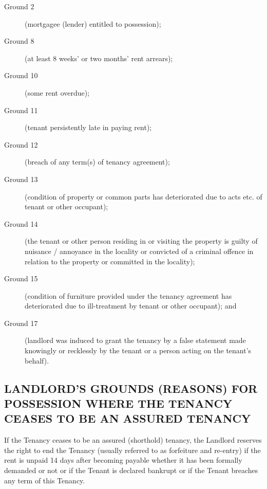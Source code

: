 \begin{description}

\item[Ground 2] (mortgagee (lender) entitled to possession);

\item[Ground 8] (at least 8 weeks' or two months' rent arrears);

\item[Ground 10] (some rent overdue);

\item[Ground 11] (tenant persistently late in paying rent);

\item[Ground 12] (breach of any term(s) of tenancy agreement);

\item[Ground 13] (condition of property or common parts has deteriorated      due to acts etc. of tenant or other occupant);

\item[Ground 14] (the tenant or other person residing in or visiting the     property is guilty of nuisance / annoyance in the locality or     convicted of a criminal offence in relation to the property or     committed in the locality);

\item[Ground 15] (condition of furniture provided under the tenancy     agreement has deteriorated due to ill-treatment by tenant or other     occupant); and

\item[Ground 17] (landlord was induced to grant the tenancy by a false     statement made knowingly or recklessly by the tenant or a person     acting on the tenant's behalf).

\end{description}

\subsection{LANDLORD'S GROUNDS (REASONS) FOR POSSESSION WHERE THE TENANCY CEASES TO BE AN ASSURED TENANCY}

If the Tenancy ceases to be an assured (shorthold) tenancy, the Landlord reserves the right to end the Tenancy (usually referred to as forfeiture and re-entry) if the rent is unpaid 14 days after becoming payable whether it has been formally demanded or not or if the Tenant is declared bankrupt or if the Tenant breaches any term of this Tenancy.


